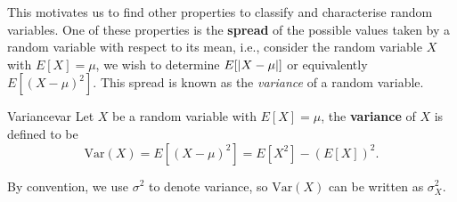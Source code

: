 \documentclass[math]{amznotes}
\theoremstyle{remark}
\begin{document}
This motivates us to find other properties to classify and characterise random variables. One of these properties is the \textbf{spread} of the possible values taken by a random variable with respect to its mean, i.e., consider the random variable $X$ with $E[X] = \mu$, we wish to determine $E[{\left\lvert {X - \mu} \right\rvert}]$ or equivalently $E[(X - \mu)^2]$. This spread is known as the \textit{variance} of a random variable.
\begin{dfnbox}{Variance}{var}
    Let $X$ be a random variable with $E[X] = \mu$, the {\color{red} \textbf{variance}} of $X$ is defined to be
    \begin{equation*}
        \mathrm{Var}(X) = E[(X - \mu)^2] = E[X^2] - (E[X])^2.
    \end{equation*}
\end{dfnbox}
By convention, we use $\sigma^2$ to denote variance, so $\mathrm{Var}(X)$ can be written as $\sigma_X^2$.
\end{document}
